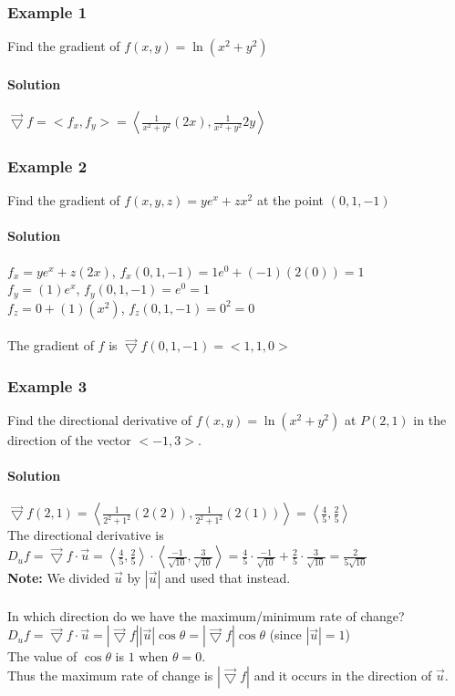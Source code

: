 \documentclass{article}
\newcommand{\tri}{\vec{\bigtriangledown}}
\begin{document}
\subsubsection{Example 1}
Find the gradient of $f(x,y)=\ln(x^2+y^2)$
\paragraph{Solution} $\tri f=<f_x,f_y>=\left< \frac{1}{x^2+y^2}(2x),\frac{1}{x^2+y^2}{2y} \right>$

\subsubsection{Example 2}
Find the gradient of $f(x,y,z)=ye^x+zx^2$ at the point $(0,1,-1)$

\paragraph{Solution} $f_x=ye^x+z(2x)$, $f_x(0,1,-1)=1e^0+(-1)(2(0))=1$
\\$f_y=(1)e^x$, $f_y(0,1,-1)=e^0=1$
\\$f_z=0+(1)(x^2)$, $f_z(0,1,-1)=0^2=0$
\\\\The gradient of $f$ is $\tri f(0,1,-1)=<1,1,0>$

\subsubsection{Example 3}
Find the directional derivative of $f(x,y)=\ln(x^2+y^2)$ at $P(2,1)$ in the direction of the vector $<-1,3>$.
\paragraph{Solution} $\tri f(2,1)=\left< \frac{1}{2^2+1^2}(2(2)),\frac{1}{2^2+1^2}(2(1)) \right>=\left<\frac{4}{5},\frac{2}{5}\right>$
\\The directional derivative is $D_uf=\tri f\cdot\vec{u}=\left<\frac{4}{5},\frac{2}{5}\right>\cdot\left<\frac{-1}{\sqrt{10}},\frac{3}{\sqrt{10}}\right>
=\frac{4}{5}\cdot\frac{-1}{\sqrt{10}}+\frac{2}{5}\cdot\frac{3}{\sqrt{10}}=\frac{2}{5\sqrt{10}}$
\\\textbf{Note:} We divided $\vec{u}$ by $|\vec{u}|$ and used that instead.
\\\\In which direction do we have the maximum/minimum rate of change?
\\$D_uf=\tri f\cdot\vec{u}=|\tri f||\vec{u}|\cos\theta =|\tri f|\cos\theta$ (since $|\vec{u}|=1$)
\\The value of $\cos\theta$ is $1$ when $\theta=0$.
\\Thus the maximum rate of change is $|\tri f|$ and it occurs in the direction of $\vec{u}$.
\end{document}
